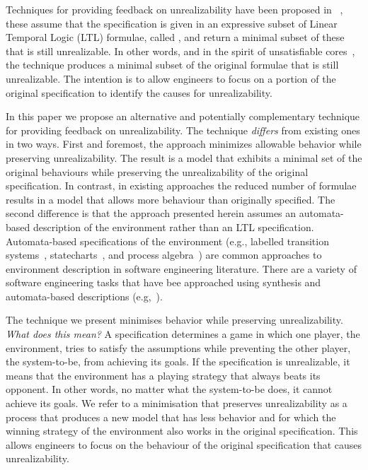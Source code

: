 Techniques for providing feedback on unrealizability have been proposed in ~\cite{DBLP:conf/fmcad/KonighoferHB09, DBLP:journals/scp/Schuppan12,DBLP:conf/fmcad/AlurMT13},
these assume that the specification is given in an expressive subset of Linear Temporal Logic (LTL) formulae, called \gr, and return a minimal subset of these that is still unrealizable. In other words, and in the spirit of unsatisfiable cores~\cite{Torlak:2008}, the technique produces a minimal subset of the original formulae that is still unrealizable. The intention is to allow engineers to focus on a portion of the original specification to identify the causes for unrealizability. 

In this paper we propose an alternative and potentially complementary technique for providing feedback on unrealizability. The technique \textit{differs} from existing ones in two ways. First and foremost, the approach minimizes allowable behavior while preserving unrealizability. The result is a model that exhibits a minimal set of the original behaviours while preserving the unrealizability of the original specification. In contrast, in existing approaches the reduced number of formulae results in a model that allows more behaviour than originally specified. The second difference is that the approach presented herein assumes an automata-based description of the environment rather than an LTL specification. Automata-based specifications of the environment (e.g., labelled transition systems~\cite{Keller:1976}, statecharts~\cite{Harel:1987}, and process algebra~\cite{Milner:1982,Hoare:1983}) are common approaches to environment description in software engineering literature. There are a variety of software engineering tasks that have bee approached using synthesis and automata-based descriptions (e.g,~\cite{Letier:2013:RMS,DIppolito:2013,Pistore:2004:PMW}). %

The technique we present minimises behavior  while preserving unrealizability. \textit{What does this mean?} A specification determines a game in which one player, the environment, tries to satisfy the assumptions while preventing the other player, the system-to-be, from achieving its goals. If the specification is unrealizable, it means that the environment has a playing strategy that always beats its opponent. In other words, no matter what the system-to-be does, it cannot achieve its goals. We refer to a minimisation that preserves unrealizability as a process that produces a new model that has less behavior and for which the winning strategy of the environment also works in the original specification. This allows engineers to focus on the behaviour of the original specification that causes unrealizability. 

